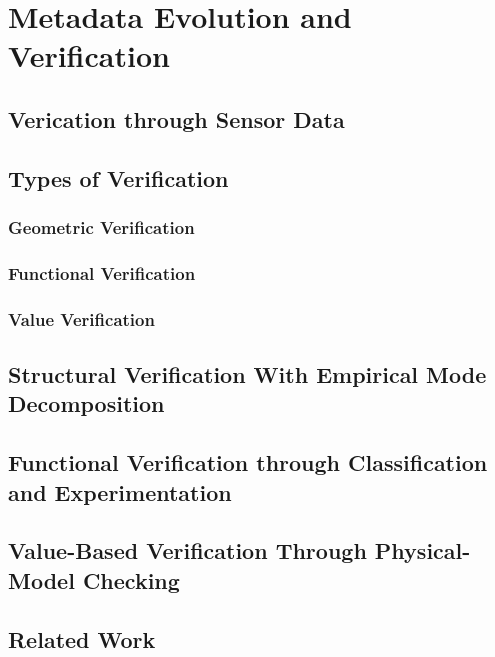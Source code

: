 \chapter{Metadata Evolution and Verification}









\section{Verication through Sensor Data}

\section{Types of Verification}
\subsection{Geometric Verification}
\subsection{Functional Verification}
\subsection{Value Verification}

\section{Structural Verification With Empirical Mode Decomposition}









\section{Functional Verification through Classification and Experimentation}

\section{Value-Based Verification Through Physical-Model Checking}

\section{Related Work}

